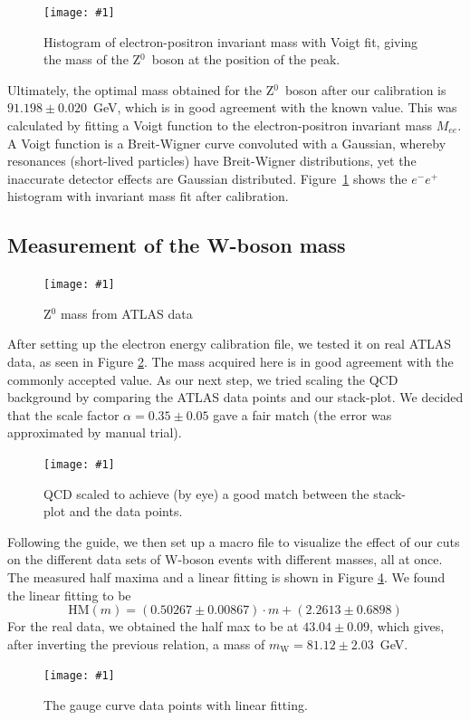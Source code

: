 \documentclass[twocolumn]{article}
\newcommand{\insertFigure}[1]{%
   \texttt{[image: \#1]}%
}
\begin{document}
\begin{figure} [!h]
	\centering
	\insertFigure{Images/FinalIteration.png}
	\caption{Histogram of electron-positron invariant mass with Voigt fit, giving the mass of the Z$^0$~boson at the position of the peak.}
	\label{fig:final_iteration}
\end{figure}
\par Ultimately, the optimal mass obtained for the Z$^0$~boson after our calibration is $91.198 \pm 0.020$~GeV, which is in good agreement with the known value. This was calculated by fitting a Voigt function to the electron-positron invariant mass $M_{ee}$. A Voigt function is a Breit-Wigner curve convoluted with a Gaussian, whereby resonances (short-lived particles) have Breit-Wigner distributions, yet the inaccurate detector effects are Gaussian distributed.  Figure~\ref{fig:final_iteration} shows the $e^-e^+$ histogram with invariant mass fit after calibration.

\subsection{Measurement of the W-boson mass}
\begin{figure}[!h]
\centering
\insertFigure{Images/FirstWFit.png}
\caption{Z$^0$ mass from ATLAS data}
\label{fig:Z0ATLAS}
\end{figure}
After setting up the electron energy calibration file, we tested it on real ATLAS data, as seen in Figure \ref{fig:Z0ATLAS}. The mass acquired here is in good agreement with the commonly accepted value. As our next step, we tried scaling the QCD background by comparing the ATLAS data points and our stack-plot. We decided that the scale factor $\alpha = 0.35 \pm 0.05$ gave a fair match (the error was approximated by manual trial).
\begin{figure}[!h]
\centering
\insertFigure{Images/ptw_scale.png}
\caption{QCD scaled to achieve (by eye) a good match between the stack-plot and the data points.}
\label{fig:QCDscalefactor}
\end{figure}
Following the guide, we then set up a macro file to visualize the effect of our cuts on the different data sets of W-boson events with different masses, all at once. The measured half maxima and a linear fitting is shown in Figure \ref{fig:gaugecurve}. We found the linear fitting to be
\begin{equation}\nonumber
\text{HM}(m) = (0.50267 \pm 0.00867)\cdot m + (2.2613 \pm 0.6898)
\end{equation}
For the real data, we obtained the half max to be at $43.04 \pm 0.09$, which gives, after inverting the previous relation, a mass of $m_\text{W} = 81.12 \pm 2.03$~GeV.
\begin{figure}[!h]
\centering
\insertFigure{Images/Jacobihalfmax.png}
\caption{The gauge curve data points with linear fitting.}
\label{fig:gaugecurve}
\end{figure}
\end{document}
